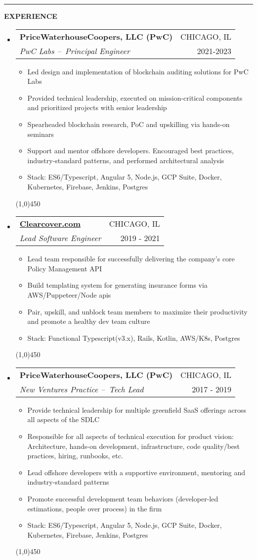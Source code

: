 \documentclass[letterpaper,11pt]{article}
\makeatletter
\newcommand{\resitem}[1]{\item #1 \vspace{-3pt}}
\newcommand{\resheading}[1]{{\large {\textbf{#1 \vphantom{p\^{E}}}}}}
\newcommand{\thinline}{\line(1,0){450}}
\newcommand{\addline}{\noindent\rule{\textwidth}{2pt}}
\newcommand{\ressubheading}[4]{
	\begin{tabular*}{6.5in}{l@{\extracolsep{\fill}}r}
    \textbf{#1} & \MakeUppercase{#2} \\
			\textit{#3} & #4 \\
	\end{tabular*}\vspace{-6pt}}
\makeatother
\begin{document}
\pagebreak
\addline

\resheading{EXPERIENCE}
\begin{itemize}

\item
  \ressubheading{PriceWaterhouseCoopers, LLC (PwC)}{Chicago, IL}{PwC Labs – Principal Engineer}{2021-2023}
	\begin{itemize}
    \resitem{Led design and implementation of blockchain auditing solutions for PwC Labs}
    \resitem{Provided technical leadership, executed on mission-critical components and prioritized projects with senior leadership}
		\resitem{Spearheaded blockchain research, PoC and upskilling via hands-on seminars}
		\resitem{Support and mentor offshore developers. Encouraged best practices, industry-standard patterns, and performed architectural analysis}
		\resitem{Stack: ES6/Typescript, Angular 5, Node.js, GCP Suite, Docker, Kubernetes, Firebase, Jenkins, Postgres}
	\end{itemize}
  \thinline

\item
  \ressubheading{\href{https://clearcover.com}{Clearcover.com}}{Chicago, IL}{Lead Software Engineer}{2019 - 2021}
	\begin{itemize}
    	\resitem{Lead team responsible for successfully delivering the company's core Policy Management API}
    	\resitem{Build templating system for generating insurance forms via AWS/Puppeteer/Node apis}
		\resitem{Pair, upskill, and unblock team members to maximize their productivity and promote a healthy dev team culture}
		\resitem{Stack: Functional Typescript(v3.x), Rails, Kotlin, AWS/K8s, Postgres}
	\end{itemize}
  \thinline

\item
  \ressubheading{PriceWaterhouseCoopers, LLC (PwC)}{Chicago, IL}{New Ventures Practice – Tech Lead}{2017 - 2019}
	\begin{itemize}
    \resitem{Provide technical leadership for multiple greenfield SaaS offerings across all aspects of the SDLC}
		\resitem{Responsible for all aspects of technical execution for product vision: Architecture, hands-on development, infrastructure, code quality/best practices, hiring, runbooks, etc.}
		\resitem{Lead offshore developers with a supportive environment, mentoring and industry-standard patterns}
		\resitem{Promote successful development team behaviors (developer-led estimations, people over process) in the firm}
		\resitem{Stack: ES6/Typescript, Angular 5, Node.js, GCP Suite, Docker, Kubernetes, Firebase, Jenkins, Postgres}
	\end{itemize}
  \thinline
    


\end{itemize}
\end{document}
